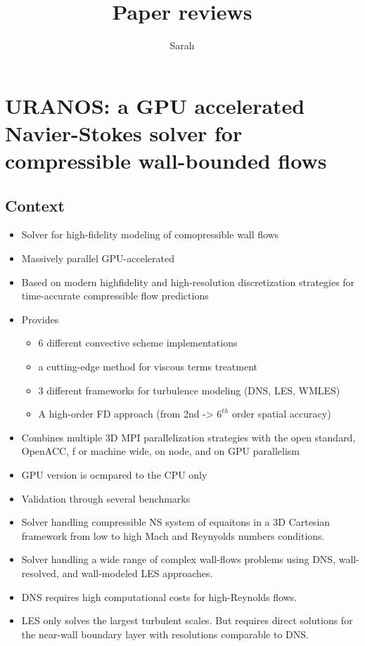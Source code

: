 \documentclass[10pt,a4paper]{article}
\author{Sarah}
\title{Paper reviews}
\begin{document}
\maketitle{}
\newpage

\section{URANOS: a GPU accelerated Navier-Stokes solver for compressible wall-bounded flows}
\subsection{Context}
\begin{itemize}
\item Solver for high-fidelity modeling of comopressible wall flows
\item Massively parallel GPU-accelerated
\item Based on modern high\-fidelity and high-resolution discretization strategies for time-accurate compressible flow predictions
\item Provides 
\begin{itemize}
\item 6 different convective scheme implementations
\item a cutting-edge method for viscous terms treatment
\item 3 different frameworks for turbulence modeling (DNS, LES, WMLES)
\item A high-order FD approach (from 2nd -> $6^{th}$ order spatial accuracy)
\end{itemize}
\item Combines multiple 3D MPI parallelization strategies with the open standard, OpenACC, f or machine wide, on node, and on GPU parallelism
\item GPU version is ocmpared to the CPU only
\item Validation through several benchmarks
\item Solver handling compressible NS system of equaitons in a 3D Cartesian framework from low to high Mach and Reynyolds numbers conditions.
\item Solver handling a wide range of complex wall-flows problems using DNS, wall-resolved, and wall-modeled LES approaches.
\item DNS requires high computational costs for high-Reynolds flows.
\item LES only solves the largest turbulent scales. But requires direct solutions for the near-wall boundary layer with resolutions comparable to DNS.

\end{itemize}
\end{document}
